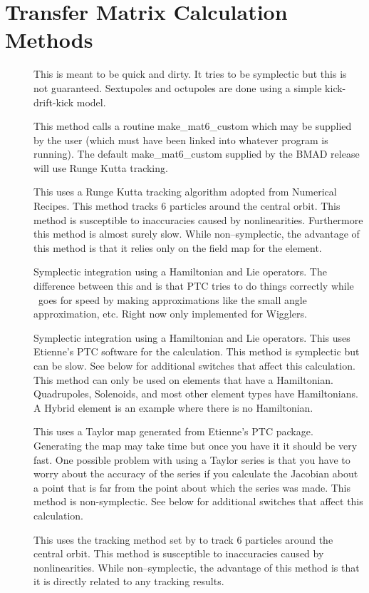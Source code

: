 \chapter{Transfer Matrix Calculation Methods}

\begin{description}

\item[]
This is meant to be quick and dirty. It tries to be symplectic but this
is not guaranteed. Sextupoles and octupoles are done using a simple
kick-drift-kick model.

\item[]
This method calls a routine make\_mat6\_custom which may be supplied
by the user (which must have been linked into whatever program is
running).  The default make\_mat6\_custom supplied by the BMAD release
will use Runge Kutta tracking. 

\item[]
This uses a Runge Kutta tracking algorithm adopted from Numerical Recipes.
This method tracks 6 particles around the central orbit. This method is
susceptible to inaccuracies caused by nonlinearities. Furthermore this method
is almost surely slow. While non--symplectic, the advantage of this method is
that it relies only on the field map for the element.

\item[]
Symplectic integration using a Hamiltonian and Lie operators. The
difference between this and  is that PTC tries to do things
correctly while \bmad\ goes for speed by making approximations like the small
angle approximation, etc. Right now only implemented for Wigglers.

\item[]
Symplectic integration using a Hamiltonian and Lie operators.
This uses Etienne's PTC software for the calculation.
This method is symplectic but can be slow. See below for additional switches
that affect this calculation. This method can only be used on elements that
have a Hamiltonian. Quadrupoles, Solenoids, and most other element types have
Hamiltonians. A Hybrid element is an example where there is no Hamiltonian.

\item[]
This uses a Taylor map generated from Etienne's PTC package. Generating
the map may take time but once you have it it should be very fast. One
possible problem with using a Taylor series is that you have to worry about
the accuracy of the series if you calculate the Jacobian about a point that is
far from the point about which the series was made. This method is
non-symplectic. See below for additional switches that affect this
calculation.

\item[]
This uses the tracking method set by  to track 6
particles around the central orbit. This method is susceptible to inaccuracies
caused by nonlinearities. While non--symplectic, the advantage of this method
is that it is directly related to any tracking results.

\end{description}

